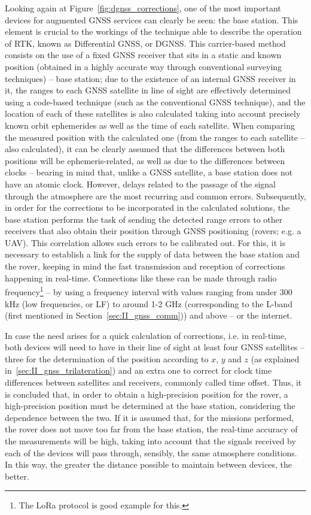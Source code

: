 Looking again at Figure~\ref{fig:dgnss_corrections}, one of the most important devices for augmented GNSS services can clearly be seen: the base station. This element is crucial to the workings of the technique able to describe the operation of RTK, known as Differential GNSS, or DGNSS. This carrier-based method consists on the use of a fixed GNSS receiver that sits in a static and known position (obtained in a highly accurate way through conventional surveying techniques) -- base station; due to the existence of an internal GNSS receiver in it, the ranges to each GNSS satellite in line of sight are effectively determined using a code-based technique (such as the conventional GNSS technique), and the location of each of these satellites is also calculated taking into account precisely known orbit ephemerides as well as the time of each satellite.
When comparing the measured position with the calculated one (from the ranges to each satellite -- also calculated), it can be clearly assumed that the differences between both positions will be ephemeris-related, as well as due to the differences between clocks
-- bearing in mind that, unlike a GNSS satellite, a base station does not have an atomic clock. However, delays related to the passage of the signal through the atmosphere are the most recurring and common errors.
Subsequently, in order for the corrections to be incorporated in the calculated solutions, the base station performs the task of sending the detected range errors to other receivers that also obtain their position through GNSS positioning (rovers; e.g. a UAV). This correlation allows such errors to be calibrated out.
For this, it is necessary to establish a link for the supply of data between the base station and the rover, keeping in mind the fast transmission and reception of corrections happening in real-time. Connections like these can be made through radio frequency\footnote{The LoRa protocol is good example for this.} -- by using a frequency interval with values ranging from under 300 kHz (low frequencies, or LF) to around 1-2 GHz (corresponding to the L-band (first mentioned in Section~\ref{sec:II_gnss_comm})) and above -- or the internet.

In case the need arises for a quick calculation of corrections, i.e. in real-time, both devices will need to have in their line of sight at least four GNSS satellites -- three for the determination of the position according to $x$, $y$ and $z$ (as explained in~\ref{sec:II_gnss_trilateration}) and an extra one to correct for clock time differences between satellites and receivers, commonly called time offset. Thus, it is concluded that, in order to obtain a high-precision position for the rover, a high-precision position must be determined at the base station, considering the dependence between the two. If it is assumed that, for the missions performed, the rover does not move too far from the base station, the real-time accuracy of the measurements will be high, taking into account that the signals received by each of the devices will pass through, sensibly, the same atmosphere conditions. In this way, the greater the distance possible to maintain between devices, the better.

